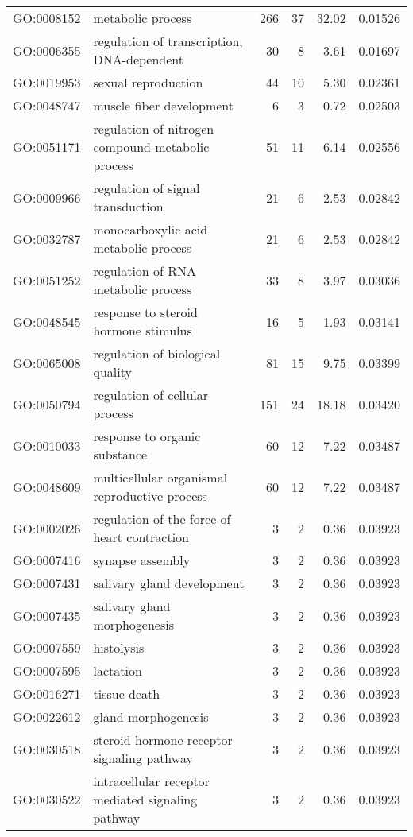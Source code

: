 \begin{longtable}{lp{4.5cm}rrrl}
  GO:0008152 & metabolic process & 266 &  37 & 32.02 & 0.01526 \\ 
  GO:0006355 & regulation of transcription, DNA-dependent &  30 &   8 & 3.61 & 0.01697 \\ 
  GO:0019953 & sexual reproduction &  44 &  10 & 5.30 & 0.02361 \\ 
  GO:0048747 & muscle fiber development &   6 &   3 & 0.72 & 0.02503 \\ 
  GO:0051171 & regulation of nitrogen compound metabolic process &  51 &  11 & 6.14 & 0.02556 \\ 
  GO:0009966 & regulation of signal transduction &  21 &   6 & 2.53 & 0.02842 \\ 
  GO:0032787 & monocarboxylic acid metabolic process &  21 &   6 & 2.53 & 0.02842 \\ 
  GO:0051252 & regulation of RNA metabolic process &  33 &   8 & 3.97 & 0.03036 \\ 
  GO:0048545 & response to steroid hormone stimulus &  16 &   5 & 1.93 & 0.03141 \\ 
  GO:0065008 & regulation of biological quality &  81 &  15 & 9.75 & 0.03399 \\ 
  GO:0050794 & regulation of cellular process & 151 &  24 & 18.18 & 0.03420 \\ 
  GO:0010033 & response to organic substance &  60 &  12 & 7.22 & 0.03487 \\ 
  GO:0048609 & multicellular organismal reproductive process &  60 &  12 & 7.22 & 0.03487 \\ 
  GO:0002026 & regulation of the force of heart contraction &   3 &   2 & 0.36 & 0.03923 \\ 
  GO:0007416 & synapse assembly &   3 &   2 & 0.36 & 0.03923 \\ 
  GO:0007431 & salivary gland development &   3 &   2 & 0.36 & 0.03923 \\ 
  GO:0007435 & salivary gland morphogenesis &   3 &   2 & 0.36 & 0.03923 \\ 
  GO:0007559 & histolysis &   3 &   2 & 0.36 & 0.03923 \\ 
  GO:0007595 & lactation &   3 &   2 & 0.36 & 0.03923 \\ 
  GO:0016271 & tissue death &   3 &   2 & 0.36 & 0.03923 \\ 
  GO:0022612 & gland morphogenesis &   3 &   2 & 0.36 & 0.03923 \\ 
  GO:0030518 & steroid hormone receptor signaling pathway &   3 &   2 & 0.36 & 0.03923 \\ 
  GO:0030522 & intracellular receptor mediated signaling pathway &   3 &   2 & 0.36 & 0.03923 \\ 

\end{longtable}
